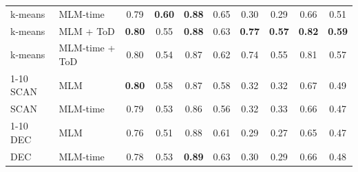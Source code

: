 \begin{table}[t]
\begin{tabular}{llcccccc|cc}
k-means & MLM-time & 0.79 & \textbf{0.60} & \textbf{0.88} & 0.65 & 0.30 & 0.29 & 0.66 & 0.51 \\
k-means & MLM + ToD & \textbf{0.80} & 0.55 & \textbf{0.88} & 0.63 & \textbf{0.77} & \textbf{0.57} & \textbf{0.82} & \textbf{0.59} \\
k-means & MLM-time + ToD & 0.80 & 0.54 & 0.87 & 0.62 & 0.74 & 0.55 & 0.81 & 0.57 \\
\cmidrule{1-10}
SCAN & MLM & \textbf{0.80} & 0.58 & 0.87 & 0.58 & 0.32 & 0.32 & 0.67 & 0.49 \\
SCAN & MLM-time & 0.79 & 0.53 & 0.86 & 0.56 & 0.32 & 0.33 & 0.66 & 0.47 \\
\cmidrule{1-10}
DEC & MLM & 0.76 & 0.51 & 0.88 & 0.61 & 0.29 & 0.27 & 0.65 & 0.47 \\
DEC & MLM-time & 0.78 & 0.53 & \textbf{0.89} & 0.63 & 0.30 & 0.29 & 0.66 & 0.48 \\
\bottomrule
\end{tabular}
\end{table}
